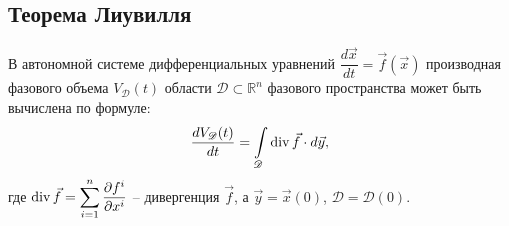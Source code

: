 \subsection{Теорема Лиувилля}

\begin{theorem}
В автономной системе дифференциальных уравнений $\dfrac{d\vec{x}}{dt} = \vec{f}(\vec{x})$ производная фазового объема $V_\mathscr{D}(t)$ области $\mathscr{D} \subset \mathbb{R}^n$ фазового пространства может быть вычислена по формуле:
\begin{equation*}
    \frac{dV_\mathscr{D}(t)}{dt} = \int\limits_{\mathscr{D}} \operatorname{div}\vec{f}\cdot d\vec{y},
\end{equation*}
где $\displaystyle \operatorname{div} \vec{f} = \sum\limits_{i = 1}^n \frac{\partial f^i}{\partial x^i}$ -- дивергенция $\vec{f}$, а $\vec{y} = \vec{x}(0)$, $\mathscr{D} = \mathscr{D}(0)$.
\end{theorem}

